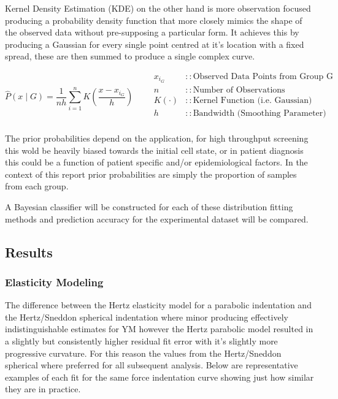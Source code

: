\documentclass[
  paper=a4,
  ,captions=tableheading
]{scrartcl}
\begin{document}
Kernel Density Estimation (KDE) on the other hand is more observation
focused producing a probability density function that more closely
mimics the shape of the observed data without pre-supposing a particular
form. It achieves this by producing a Gaussian for every single point
centred at it's location with a fixed spread, these are then summed to
produce a single complex curve.

\[
{  
\hat{P}(x \mid G) =  
\frac{1}{n h} \sum_{i=1}^{n} K\left( \frac{x - x_{i_G}}{h} \right)  
}  
\qquad  
\begin{align}  
x_{i_G}           &:: \text{Observed Data Points from Group G}\\
n                 &:: \text{Number of Observations}\\
K(\cdot)          &:: \text{Kernel Function (i.e. Gaussian)}\\
h                 &:: \text{Bandwidth (Smoothing Parameter)}\\
\end{align}
\]

The prior probabilities depend on the application, for high throughput
screening this wold be heavily biased towards the initial cell state, or
in patient diagnosis this could be a function of patient specific and/or
epidemiological factors. In the context of this report prior
probabilities are simply the proportion of samples from each group.

A Bayesian classifier will be constructed for each of these distribution
fitting methods and prediction accuracy for the experimental dataset
will be compared.

\subsection{Results}\label{results}

\subsubsection{Elasticity Modeling}\label{elasticity-modeling-1}

The difference between the Hertz elasticity model for a parabolic
indentation and the Hertz/Sneddon spherical indentation where minor
producing effectively indistinguishable estimates for YM however the
Hertz parabolic model resulted in a slightly but consistently higher
residual fit error with it's slightly more progressive curvature. For
this reason the values from the Hertz/Sneddon spherical where preferred
for all subsequent analysis. Below are representative examples of each
fit for the same force indentation curve showing just how similar they
are in practice.
\end{document}

